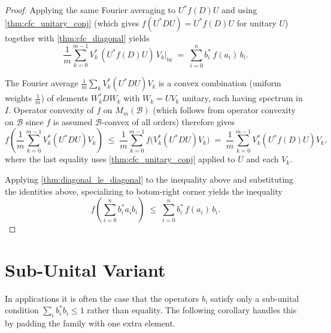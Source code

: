 \begin{theorem}
\begin{proof}
    Applying the same Fourier averaging to $U^* f(D) U$ and using \ref{thm:cfc_unitary_conj}
    (which gives $f(U^* D U) = U^* f(D) U$ for unitary $U$) together with \ref{thm:cfc_diagonal}
    yields
    \[
      \frac{1}{m} \sum_{k=0}^{m-1} V_k^*\,(U^* f(D) U)\,V_k\bigg|_{\mathrm{br}}
      \;=\; \sum_{i=0}^n b_i^*\, f(a_i)\, b_i.
    \]

    The Fourier average $\frac{1}{m}\sum_k V_k^*(U^* D U)V_k$ is a convex combination
    (uniform weights $\frac{1}{m}$) of elements $W_k^* D W_k$ with $W_k = U V_k$ unitary,
    each having spectrum in $I$.
    Operator convexity of $f$ on $M_m(\mathcal{B})$ (which follows from operator convexity
    on $\mathcal{B}$ since $f$ is assumed $\mathcal{B}$-convex of all orders) therefore gives
    \[
      f\!\left(\frac{1}{m}\sum_{k=0}^{m-1} V_k^*(U^* D U)V_k\right)
      \;\leq\;
      \frac{1}{m}\sum_{k=0}^{m-1} f\!\bigl(V_k^*(U^* D U)V_k\bigr)
      \;=\;
      \frac{1}{m}\sum_{k=0}^{m-1} V_k^*(U^* f(D) U)V_k,
    \]
    where the last equality uses \ref{thm:cfc_unitary_conj} applied to $U$ and each $V_k$.

    Applying \ref{thm:diagonal_le_diagonal} to the inequality above and substituting the identities above, specializing to 
    botom-right corner yields the inequality
    \[
      f\!\left(\sum_{i=0}^{n} b_i^* a_i b_i\right)
      \;\leq\;
      \sum_{i=0}^{n} b_i^*\, f(a_i)\, b_i.
    \]
  \end{proof}
\end{theorem}

\section{Sub-Unital Variant}

In applications it is often the case that the operators $b_i$ satisfy only a
sub-unital condition $\sum_i b_i^* b_i \leq 1$ rather than equality.
The following corollary handles this by padding the family with one extra element.

